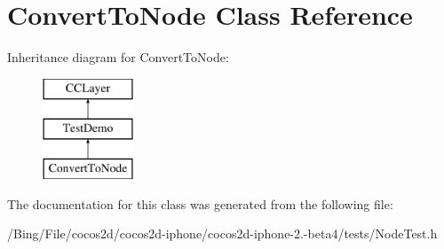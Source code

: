 \hypertarget{interface_convert_to_node}{\section{Convert\-To\-Node Class Reference}
\label{interface_convert_to_node}
}
Inheritance diagram for Convert\-To\-Node\-:\begin{figure}[H]
\begin{center}
\leavevmode
\includegraphics[height=3.000000cm]{interface_convert_to_node}
\end{center}
\end{figure}


The documentation for this class was generated from the following file\-:\begin{DoxyCompactItemize}
\item 
/\-Bing/\-File/cocos2d/cocos2d-\/iphone/cocos2d-\/iphone-\/2.-\/beta4/tests/Node\-Test.\-h\end{DoxyCompactItemize}
